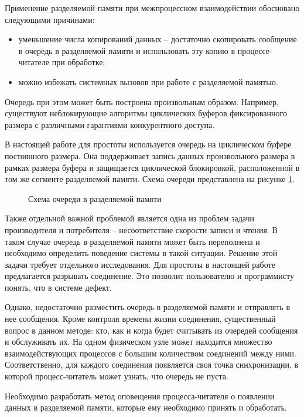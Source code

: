Применение разделяемой памяти при межпроцессном взаимодействии обосновано следующими причинами:
\begin{itemize}
\item уменьшение числа копирований данных -- достаточно скопировать сообщение в очередь в разделяемой памяти и использовать эту копию в процессе-читателе при обработке;
\item можно избежать системных вызовов при работе с разделяемой памятью.
\end{itemize}

Очередь при этом может быть построена произвольным образом. Например, существуют неблокирующие алгоритмы циклических буферов фиксированного размера с различными гарантиями конкурентного доступа.

В настоящей работе для простоты используется очередь на циклическом буфере постоянного размера. Она поддерживает запись данных произвольного размера в рамках размера буфера и защищается циклической блокировкой, расположенной в том же сегменте разделяемой памяти. Схема очереди представлена на рисунке \ref{chapter31:ShmemQueue}.

\begin{figure}[!h]
\caption{Схема очереди в разделяемой памяти}
\label{chapter31:ShmemQueue}
\end{figure}

Также отдельной важной проблемой является одна из проблем задачи производителя и потребителя -- несоответствие скорости записи и чтения. В таком случае очередь в разделяемой памяти может быть переполнена и необходимо определить поведение системы в такой ситуации. Решение этой задачи требует отдельного исследования. Для простоты в настоящей работе предлагается разрывать соединение. Это позволит пользователю и программисту понять, что в системе дефект.

Однако, недостаточно разместить очередь в разделяемой памяти и отправлять в нее сообщения. Кроме контроля времени жизни соединения, существенный вопрос в данном методе: кто, как и когда будет считывать из очередей сообщения и обслуживать их. На одном физическом узле может находится множество взаимодействующих процессов с большим количеством соединений между ними. Соответственно, для каждого соединения появляется своя точка синхронизации, в которой процесс-читатель может узнать, что очередь не пуста.

Необходимо разработать метод оповещения процесса-читателя о появлении данных в разделяемой памяти, которые ему необходимо принять и обработать.
%
%


